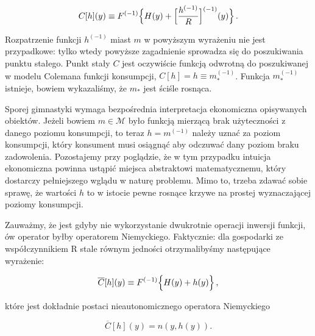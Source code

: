 \begin{equation}\label{not_so_easy_to_differentiate}
C[h](y) \equiv F^{(-1)} \Bigl \{ H(y) + \Big[ \frac{h^{(-1)}}{R} \Big]^{(-1)}(y) \Bigl \}\,.
\end{equation}

Rozpatrzenie funkcji $h^{(-1)}$ miast $m$ w powyższym wyrażeniu nie jest przypadkowe: tylko wtedy powyższe zagadnienie sprowadza się do poszukiwania punktu stałego. Punkt stały $ C $ jest oczywiście funkcją odwrotną do poszukiwanej w modelu Colemana funkcji konsumpcji, $ C[h] = h \equiv m_{*}^{(-1)} $. Funkcja $m_{*}^{(-1)}$ istnieje, bowiem wykazaliśmy, że $ m_{*} $ jest ściśle rosnąca. 


Sporej gimnastyki wymaga bezpośrednia interpretacja ekonomiczna opisywanych obiektów. Jeżeli bowiem $m \in \mathcal{M}$ było funkcją mierzącą brak użyteczności z danego poziomu konsumpcji, to teraz $h = m^{(-1)}$ należy uznać za poziom konsumpcji, który konsument musi osiągnąć aby odczuwać dany poziom braku zadowolenia. Pozostajemy przy poglądzie, że w tym przypadku intuicja ekonomiczna powinna ustąpić miejsca abstraktowi matematycznemu, który dostarczy pełniejszego wglądu w naturę problemu. Mimo to, trzeba zdawać sobie sprawę, że wartości $h$ to w istocie pewne rosnące krzywe na prostej wyznaczającej poziomy konsumpcji.


Zauważmy, że jest gdyby nie wykorzystanie dwukrotnie operacji inwersji funkcji, ów operator byłby operatorem Niemyckiego. Faktycznie: dla gospodarki ze współczynnikiem R stale równym jedności otrzymalibyśmy następujące wyrażenie:

\begin{equation}\label{easy_to_differentiate}
\overline{C}[h](y) \equiv F^{(-1)} \Bigl \{ H(y) + h(y) \Bigl \}\,,
\end{equation}

które jest dokładnie postaci nieautonomicznego operatora Niemyckiego

\begin{equation*}
\overline{C}[h](y) = n(y, h(y)).
\end{equation*}


